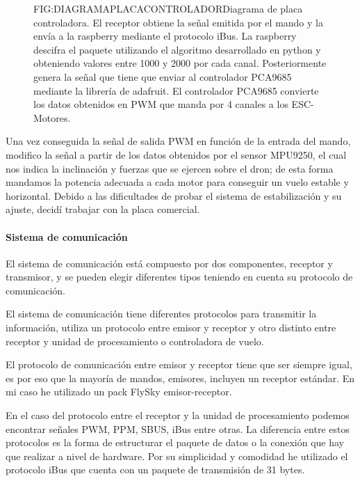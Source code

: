 \begin{figure}[Diagrama placa controladora desarrollada]{FIG:DIAGRAMAPLACACONTROLADOR}{Diagrama de placa controladora. El receptor obtiene la señal emitida por el mando y la envía a la raspberry mediante el protocolo iBus. La raspberry descifra el paquete utilizando el algoritmo desarrollado  en python y obteniendo valores entre 1000 y 2000 por cada canal. Posteriormente genera la señal que tiene que enviar al controlador PCA9685 mediante la librería de adafruit. El controlador PCA9685 convierte los datos obtenidos en PWM que manda por 4 canales a los ESC-Motores.}
\end{figure}

Una vez conseguida la señal de salida PWM en función de la entrada del mando, modifico la señal a partir de los datos obtenidos por el sensor MPU9250, el cual nos indica la inclinación y fuerzas que se ejercen sobre el dron; de esta forma mandamos la potencia adecuada a cada motor para conseguir un vuelo estable y horizontal. Debido a las dificultades de probar el sistema de estabilización y su ajuste, decidí trabajar con la placa comercial.

\paragraph{Sistema de comunicación}

	El sistema de comunicación está compuesto por dos componentes, receptor y transmisor, y se pueden elegir diferentes tipos teniendo en cuenta su protocolo de comunicación. 
	
	El sistema de comunicación tiene diferentes protocolos para transmitir la información, utiliza un protocolo entre emisor y receptor y otro distinto entre receptor y unidad de procesamiento o controladora de vuelo.\cite{Eric2017}
	
	
	El protocolo de comunicación entre emisor y receptor tiene que ser siempre igual, es por eso que la mayoría de mandos, emisores, incluyen un receptor estándar. En mi caso he utilizado un pack FlySky emisor-receptor.
	
	En el caso del protocolo entre el receptor y la unidad de procesamiento podemos encontrar señales PWM, PPM, SBUS, iBus entre otras. La diferencia entre estos protocolos es la forma de estructurar el paquete de datos o la conexión que hay que realizar a nivel de hardware. Por su simplicidad y comodidad he utilizado el protocolo iBus que cuenta con un paquete de transmisión de 31 bytes.
	